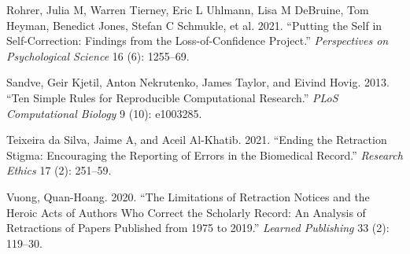 \documentclass[
]{article}
\newlength{\cslhangindent}
\newlength{\cslentryspacingunit} %
\newenvironment{CSLReferences}[2] %
 {%
  \setlength{\parindent}{0pt}
  \ifodd #1
  \let\oldpar\par
  \def\par{\hangindent=\cslhangindent\oldpar}
  \fi
  \setlength{\parskip}{#2\cslentryspacingunit}
 }%
 {}
\begin{document}
\begin{CSLReferences}{1}{0}
\leavevmode{}%
Rohrer, Julia M, Warren Tierney, Eric L Uhlmann, Lisa M DeBruine, Tom
Heyman, Benedict Jones, Stefan C Schmukle, et al. 2021. {``Putting the
Self in Self-Correction: Findings from the Loss-of-Confidence
Project.''} \emph{Perspectives on Psychological Science} 16 (6):
1255--69.

\leavevmode{}%
Sandve, Geir Kjetil, Anton Nekrutenko, James Taylor, and Eivind Hovig.
2013. {``Ten Simple Rules for Reproducible Computational Research.''}
\emph{PLoS Computational Biology} 9 (10): e1003285.

\leavevmode{}%
Teixeira da Silva, Jaime A, and Aceil Al-Khatib. 2021. {``Ending the
Retraction Stigma: Encouraging the Reporting of Errors in the Biomedical
Record.''} \emph{Research Ethics} 17 (2): 251--59.

\leavevmode{}%
Vuong, Quan-Hoang. 2020. {``The Limitations of Retraction Notices and
the Heroic Acts of Authors Who Correct the Scholarly Record: An Analysis
of Retractions of Papers Published from 1975 to 2019.''} \emph{Learned
Publishing} 33 (2): 119--30.

\end{CSLReferences}
\end{document}
